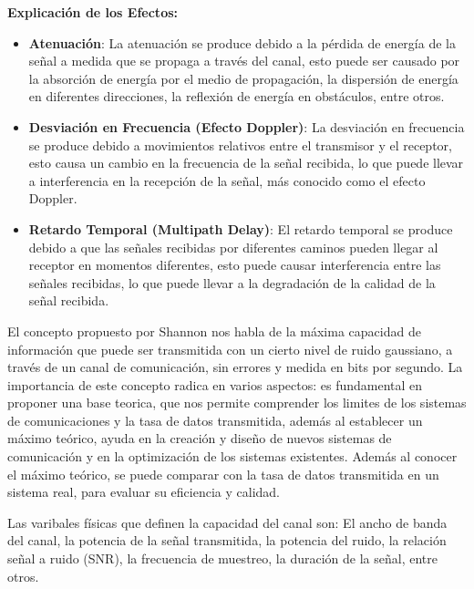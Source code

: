 \documentclass[
  11pt,
  letterpaper,
  answers
]{exam}
\begin{document}
\begin{questions}
\begin{solution}
\textbf{Explicación de los Efectos:}
\begin{itemize}
    \item \textbf{Atenuación}: La atenuación se produce debido a la pérdida de energía de la señal a medida que se propaga a través del canal, esto puede ser causado por la absorción de energía por el medio de propagación, la dispersión de energía en diferentes direcciones, la reflexión de energía en obstáculos, entre otros.
    \item \textbf{Desviación en Frecuencia (Efecto Doppler)}: La desviación en frecuencia se produce debido a movimientos relativos entre el transmisor y el receptor, esto causa un cambio en la frecuencia de la señal recibida, lo que puede llevar a interferencia en la recepción de la señal, más conocido como el efecto Doppler.
    \item \textbf{Retardo Temporal (Multipath Delay)}: El retardo temporal se produce debido a que las señales recibidas por diferentes caminos pueden llegar al receptor en momentos diferentes, esto puede causar interferencia entre las señales recibidas, lo que puede llevar a la degradación de la calidad de la señal recibida.
\end{itemize}
\end{solution}
\begin{solution}
El concepto propuesto por Shannon nos habla de la máxima capacidad de información que puede ser transmitida con un cierto nivel de ruido gaussiano, a través de un canal de comunicación, sin errores y medida en bits por segundo. La importancia de este concepto radica en varios aspectos: es fundamental en proponer una base teorica, que nos permite comprender los limites de los sistemas de comunicaciones y la tasa de datos transmitida, además al establecer un máximo teórico, ayuda en la creación y diseño de nuevos sistemas de comunicación y en la optimización de los sistemas existentes. Además al conocer el máximo teórico, se puede comparar con la tasa de datos transmitida en un sistema real, para evaluar su eficiencia y calidad.

Las varibales físicas que definen la capacidad del canal son: El ancho de banda del canal, la potencia de la señal transmitida, la potencia del ruido, la relación señal a ruido (SNR), la frecuencia de muestreo, la duración de la señal, entre otros.
\end{solution}


\end{questions}
\end{document}
